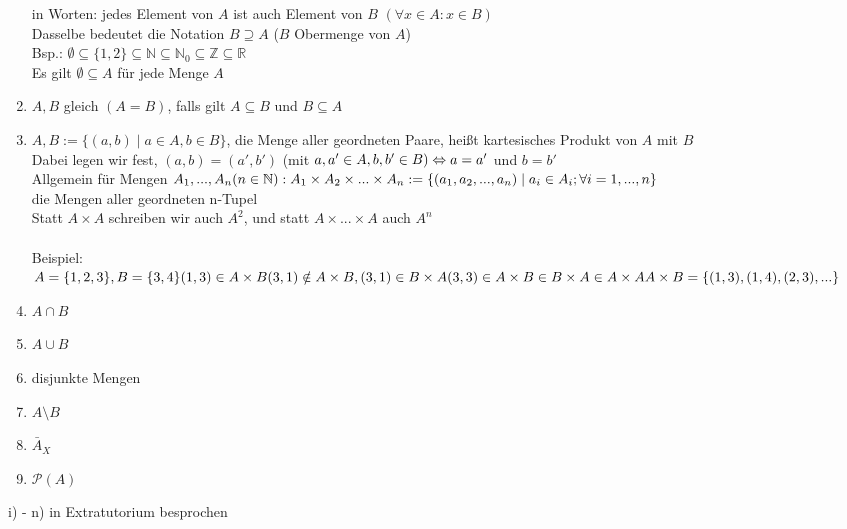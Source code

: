 \documentclass[a4paper,11pt]{article}
\begin{document}
\begin{enumerate}[label=\alph*)]
	in Worten: jedes Element von $A$ ist auch Element von $B$ $(\forall x \in A : x \in B)$ \\
	Dasselbe bedeutet die Notation $B \supseteq A$ ($B$ Obermenge von $A$) \\
	Bsp.: $\emptyset \subseteq \{1, 2\} \subseteq \mathbb{N} \subseteq \mathbb{N}_0 \subseteq \mathbb{Z} \subseteq \mathbb{R}$ \\
	Es gilt $\emptyset \subseteq A$ für jede Menge $A$
	\item $A, B$ gleich $(A = B)$, falls gilt $A \subseteq B$ und $B \subseteq A$
	\item $A, B := \{(a, b) \mid a \in A, b \in B\}$, die Menge aller geordneten Paare, heißt kartesisches Produkt von $A$ mit $B$ \\
	Dabei legen wir fest, $(a, b) = (a', b')$ (mit $a, a' \in A, b, b' \in B) \\
	\Leftrightarrow a = a'$ und $b = b'$ \\
	Allgemein für Mengen $A_1, ..., A_n (n \in \mathbb{N}): \\
	A_1 \times A_2 \times ... \times A_n := \{(a_1, a_2, ..., a_n) \mid a_i \in A_i; \forall i = 1, ..., n\}$ \\
	die Mengen aller geordneten n-Tupel \\
	Statt $A \times A$ schreiben wir auch $A^2$, und statt $A \times ... \times A$ auch $A^n$ \\
	\\
	Beispiel: \\
	$A = \{1, 2, 3\},  B = \{3, 4\} \\
	(1, 3) \in A \times B \\
	(3, 1) \notin A \times B, (3, 1) \in B \times A \\
	(3, 3) \in A \times B \in B \times A \in A \times A \\
	A \times B = \{(1, 3), (1, 4), (2, 3), ...\}$ \\
	\newpage
	\item $A \cap B$
	\item $A \cup B$
	\item disjunkte Mengen
	\item$A \setminus B$
	\item $\bar{A}_X$
	\item $\mathcal{P}(A)$
\end{enumerate}
i) - n) in Extratutorium besprochen
\end{document}
